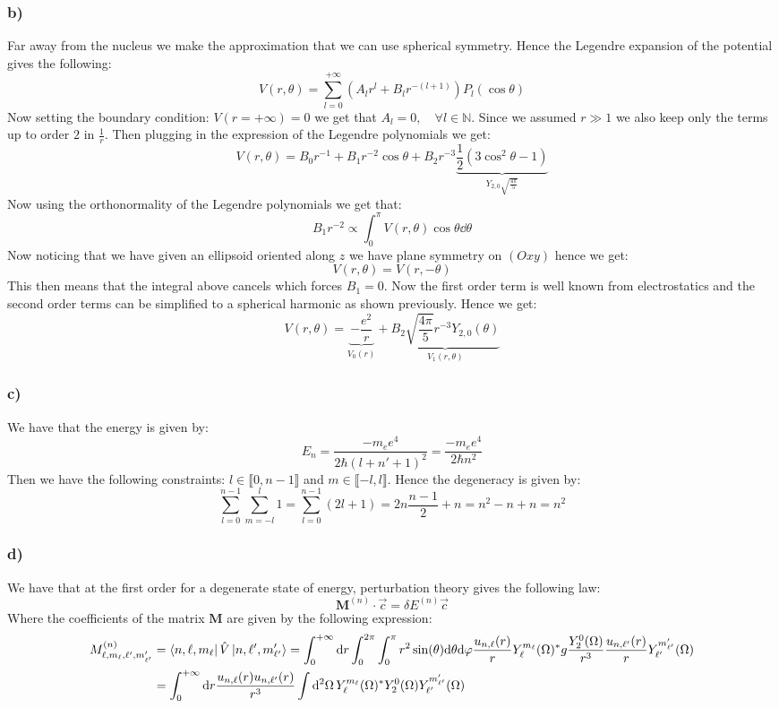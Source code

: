\documentclass[10pt,a4paper]{book}
\begin{document}
\subsubsection*{b)}
Far away from the nucleus we make the approximation that we can use spherical symmetry. Hence the Legendre expansion of the potential gives the following:
\[
V(r, \theta) = \sum_{l = 0}^{+\infty} (A_l r^l + B_l r^{-(l+1)}) P_l(\cos\theta)
\]
Now setting the boundary condition: $V(r = +\infty) = 0$ we get that $A_l = 0, \quad \forall l \in \mathbb{N}$. Since we assumed $r \gg 1$ we also keep only the terms up to order $2$ in $\frac{1}{r}$. Then plugging in the expression of the Legendre polynomials we get:
\[
V(r, \theta) = B_0 r^{-1} + B_1 r^{-2} \cos \theta + B_2 r^{-3} \underbrace{\frac{1}{2} (3 \cos^2\theta - 1)}_{Y_{2,0} \sqrt{\frac{4 \pi}{5}}}
\]
Now using the orthonormality of the Legendre polynomials we get that:
\[
B_1 r^{-2} \propto \int_{0}^{\pi} V(r, \theta) \cos \theta \dd \theta
\]
Now noticing that we have given an ellipsoid oriented along $z$ we have plane symmetry on $(Oxy)$ hence we get:
\[
V(r, \theta) = V(r, -\theta)
\]
This then means that the integral above cancels which forces $B_1 = 0$. Now the first order term is well known from electrostatics and the second order terms can be simplified to a spherical harmonic as shown previously. Hence we get:
\[
V(r, \theta) = \underbrace{-\frac{e^2}{r}}_{V_0(r)} + \underbrace{B_2 \sqrt{\frac{4\pi}{5}} r^{-3} Y_{2,0}(\theta)}_{V_1(r, \theta)} 
\]

\subsubsection*{c)}
We have that the energy is given by:
\[
E_n = \frac{-m_e e^4}{2\hbar (l + n' + 1)^2} = \frac{-m_e e^4}{2\hbar n^2}
\]
Then we have the following constraints: $ l \in \llbracket 0, n-1 \rrbracket$ and $ m \in \llbracket -l , l \rrbracket$. Hence the degeneracy is given by:
\[
\sum_{l = 0}^{n - 1} \sum_{m = - l}^l 1 = \sum_{l = 0}^{n - 1} (2l + 1) = 2 n\frac{n-1}{2} + n = n^2 - n + n = n^2 
\]


\subsubsection*{d)}
We have that at the first order for a degenerate state of energy, perturbation theory gives the following law:
\[
\mathbf{M}^{(n)} \cdot \vec{c} = \delta E^{(n)} \vec{c}
\]
Where the coefficients of the matrix $\mathbf{M}$ are given by the following expression:
\begin{align*}
M^{(n)}_{\ell, m_\ell, \ell', m_{\ell'}'} &= \bra{n, \ell, m_\ell} \hat{V} \ket{n, \ell', m_{\ell'}'} = \int_0^{+\infty} \dd r \int_0^{2\pi} \int_0^\pi r^2 \sin(\theta) \dd \theta \dd \varphi \frac{u_{n, \ell}(r)}{r} Y_{\ell}^{m_\ell} (\Omega)^* g \frac{Y_{2}^0(\Omega)}{r^3} \frac{u_{n, \ell'}(r)}{r} Y_{\ell'}^{m_{\ell'}'} (\Omega) \\
&= \int_0^{+\infty} \dd r \frac{u_{n, \ell}(r) u_{n, \ell'}(r)}{r^3} \int \dd^2 \Omega \, Y_\ell^{m_\ell} (\Omega)^* Y_2^0 (\Omega) Y_{\ell'}^{m_{\ell'}'} (\Omega)
\end{align*}
\end{document}
